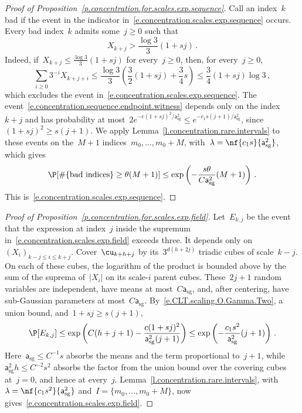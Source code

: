 \documentclass[11pt]{amsart}
\begin{document}
\begin{proof}[Proof of Proposition~\ref{p.concentration.for.scales.exp.sequence}]
Call an index~$k$ bad if the event in the indicator in~\eqref{e.concentration.scales.exp.sequence} occurs. Every bad index~$k$ admits some~$j\geq0$ such that
\begin{equation}
	X_{k+j}>\frac{\log3}3(1+sj)\,.
	\label{e.concentration.sequence.endpoint.witness}
\end{equation}
Indeed, if~$X_{k+j}\leq\frac{\log3}3(1+sj)$ for every~$j\geq0$, then, for every~$j\geq0$,
\begin{equation*}
	\sum_{i\geq0}3^{-i}X_{k+j+i}
	\leq\frac{\log3}3\left(\frac32(1+sj)+\frac34s\right)
	\leq\frac34(1+sj)\log3\,,
\end{equation*}
which excludes the event in~\eqref{e.concentration.scales.exp.sequence}. The event~\eqref{e.concentration.sequence.endpoint.witness} depends only on the index~$k+j$ and has probability at most~$2e^{-c(1+sj)^2/\mathsf a_{\mathrm{sg}}^2}\leq e^{-c_1s(j+1)/\mathsf a_{\mathrm{sg}}^2}$, since~$(1+sj)^2\geq s(j+1)$. We apply Lemma~\ref{l.concentration.rare.intervals} to these events on the~$M+1$ indices~$m_0,\ldots,m_0+M$, with~$\lambda=\nf{c_1s}{\mathsf a_{\mathrm{sg}}^2}$, which gives
\begin{equation*}
	\P[\#\{\text{bad indices}\}\geq\theta(M+1)]
	\leq\exp\left(-\frac{s\theta}{C\mathsf a_{\mathrm{sg}}^2}(M+1)\right)\,.
\end{equation*}
This is~\eqref{e.concentration.scales.exp.sequence}.
\end{proof}

\begin{proof}[Proof of Proposition~\ref{p.concentration.for.scales.exp.field}]
Let~$E_{k,j}$ be the event that the expression at index~$j$ inside the supremum in~\eqref{e.concentration.scales.exp.field} exceeds three. It depends only on~$(X_i)_{k-j\leq i\leq k+j}$. Cover~$\cu_{k+h+j}$ by its~$3^{d(h+2j)}$ triadic cubes of scale~$k-j$. On each of these cubes, the logarithm of the product is bounded above by the sum of the suprema of~$|X_i|$ on its scale-$i$ parent cubes. These~$2j+1$ random variables are independent, have means at most~$C\mathsf a_{\mathrm{sg}}$, and, after centering, have sub-Gaussian parameters at most~$C\mathsf a_{\mathrm{sg}}$. By~\eqref{e.CLT.scaling.O.Gamma.Two}, a union bound, and~$1+sj\geq s(j+1)$,
\begin{equation*}
	\P[E_{k,j}]
	\leq\exp\left(C(h+j+1)
	-\frac{c(1+sj)^2}{\mathsf a_{\mathrm{sg}}^2(j+1)}\right)
	\leq\exp\left(-\frac{c_1s^2}{\mathsf a_{\mathrm{sg}}^2}(j+1)\right)\,.
\end{equation*}
Here~$\mathsf a_{\mathrm{sg}}\leq C^{-1}s$ absorbs the means and the term proportional to~$j+1$, while~$\mathsf a_{\mathrm{sg}}^2h\leq C^{-2}s^2$ absorbs the factor from the union bound over the covering cubes at~$j=0$, and hence at every~$j$. Lemma~\ref{l.concentration.rare.intervals}, with~$\lambda=\nf{c_1s^2}{\mathsf a_{\mathrm{sg}}^2}$ and~$I=\{m_0,\ldots,m_0+M\}$, now gives~\eqref{e.concentration.scales.exp.field}.
\end{proof}
\end{document}
